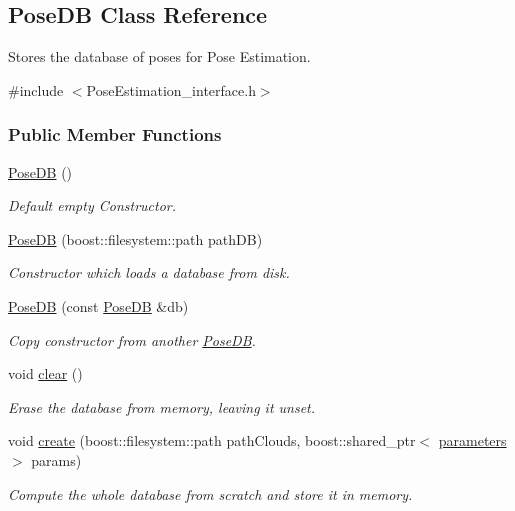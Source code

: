 \hypertarget{classPoseDB}{\subsection{Pose\-D\-B Class Reference}
\label{classPoseDB}
}


Stores the database of poses for Pose Estimation.  




{\ttfamily \#include $<$Pose\-Estimation\-\_\-interface.\-h$>$}

\subsubsection*{Public Member Functions}
\begin{DoxyCompactItemize}
\item 
\hyperlink{classPoseDB_a48e3cf9cde2b5f6a1a87e0d4f666e13f}{Pose\-D\-B} ()
\begin{DoxyCompactList}\small\item\em Default empty Constructor. \end{DoxyCompactList}\item 
\hyperlink{classPoseDB_ac7c624b7de4a42c229a9a96e1b90b0d2}{Pose\-D\-B} (boost\-::filesystem\-::path path\-D\-B)
\begin{DoxyCompactList}\small\item\em Constructor which loads a database from disk. \end{DoxyCompactList}\item 
\hyperlink{classPoseDB_af9c57a382e2693f875502d7dbd311c71}{Pose\-D\-B} (const \hyperlink{classPoseDB}{Pose\-D\-B} \&db)
\begin{DoxyCompactList}\small\item\em Copy constructor from another \hyperlink{classPoseDB}{Pose\-D\-B}. \end{DoxyCompactList}\item 
void \hyperlink{classPoseDB_a608ac44000f275c1085c208e7906b95d}{clear} ()
\begin{DoxyCompactList}\small\item\em Erase the database from memory, leaving it unset. \end{DoxyCompactList}\item 
void \hyperlink{classPoseDB_a32f79ac5a9a8be7763027a5b69b52ad1}{create} (boost\-::filesystem\-::path path\-Clouds, boost\-::shared\-\_\-ptr$<$ \hyperlink{group__Definitions_gacbb28d8f791bb363852e522cf3b83c47}{parameters} $>$ params)
\begin{DoxyCompactList}\small\item\em Compute the whole database from scratch and store it in memory. \end{DoxyCompactList}\item 

\end{DoxyCompactItemize}
